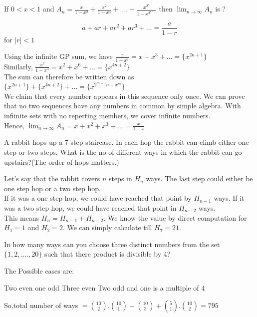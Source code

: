 \begin{CL}
If $0<x<1$ and
$A_n=\frac{x}{1-x^2}+\frac{x^2}{1-x^4}+....+\frac{x^{2^n}}{1-x^{2^{n+1}}}$ then $\lim_{n\to\infty}A_n$ is ?
\end{CL}
\begin{idea}
    \[a+ar+ar^2+ar^3+\dots=\frac{a}{1-r}\]
    for $|r|<1$\\
\end{idea}
\begin{solution}
Using the infinite GP sum, we have $\frac{x}{1-x^2}=x+x^3+\dots=\{x^{2n+1}\}$\\
Similarly, $\frac{x^2}{1-x^4}=x^2+x^6+\dots=\{x^{4n+2}\}$\\
The sum can therefore be written down as $\{x^{2n+1}\}+\{x^{4n+2}\}+\dots= \{x^{2^{m+1}n+x^m}\}$\\
We claim that every number appears in this sequence only once. We can prove that no two sequences have any numbers in common by simple algebra. With infiinite sets with no reperting members, we cover infinite numbers.\\
Hence, $\lim_{n\to\infty}A_n = x+x^2+x^3+\dots = \frac{x}{1-x}$
\end{solution}
\begin{CB}
    A rabbit hops up a 7-step staircase. In each hop the rabbit can climb either one step or two steps. What is the no of different ways in which the rabbit can go upstairs?(The order of hops matters.)
\end{CB}
\begin{solution}
    Let's say that the rabbit covers $n$ steps in $H_n$ ways. The last step could either be one step hop or a two step hop.\\
    If it was a one step hop, we could have reached that point by $H_{n-1}$ ways. If it was a two step hop, we could have reached that point in $H_{n-2}$ ways.\\
    This means $H_n=H_{n-1}+H_{n-2}$. We know the value by direct computation for $H_1=1$ and $H_2=2$. We can simply calculate till $H_7=21$.\\
\end{solution}
\begin{CB}
    In how many ways can you choose three distinct numbers from the set $\{1,2,....,20\}$ such that there product is divisible by $4$?
\end{CB}
\begin{solution}
The Possible cases are:
\begin{itemize}
\ii Two even one odd
\ii Three even
\ii Two odd and one is a multiple of $4$
\end{itemize}
So,total number of ways $=\binom{10}{2}.\binom{10}{1}+\binom{10}{3}+\binom{5}{1}.\binom{10}{2}=795$
\end{solution}
